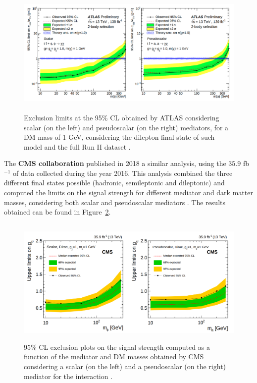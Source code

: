 \documentclass[a4paper, 10pt, openright]{report}
\begin{document}
 \begin{figure}[htbp]
\centering
\includegraphics[width=14cm, height=6.2cm]{figs/ATLASICHEP.png}
\caption{Exclusion limits at the 95\% \ac{CL} obtained by \ac{ATLAS} considering  scalar (on the left) and pseudoscalar (on the right) mediators, for a \ac{DM} mass of 1 GeV, considering the dilepton final state of such model and the full Run II dataset \cite{PreviousDoubleTopBottomAllLep13ATLAS}.}\label{fig:ATLASICHEP}
\end{figure}

The \textbf{\ac{CMS} collaboration} published in 2018 a similar analysis, using the $35.9$ fb$^{-1}$ of data collected during the year 2016. This analysis combined the three different final states possible (hadronic, semileptonic and dileptonic) and computed the limits on the signal strength for different mediator and dark matter masses, considering both scalar and pseudoscalar mediators \cite{PreviousDoubleTopAllLep13CMS}. The results obtained can be found in Figure~\ref{figure:CMSttbarExclusion}. 

\begin{figure}[htbp]
\begin{center}
\includegraphics[width=15.6cm, height=6.2cm]{figs/CMSttbarExclusion.png}
\caption{95\% \ac{CL} exclusion plots on the signal strength computed as a function of the mediator and \ac{DM} masses obtained by \ac{CMS} considering a scalar (on the left) and a pseudoscalar (on the right) mediator for the interaction \cite{PreviousDoubleTopAllLep13CMS}.}
\label{figure:CMSttbarExclusion}
\end{center}
\end{figure}
\end{document}

